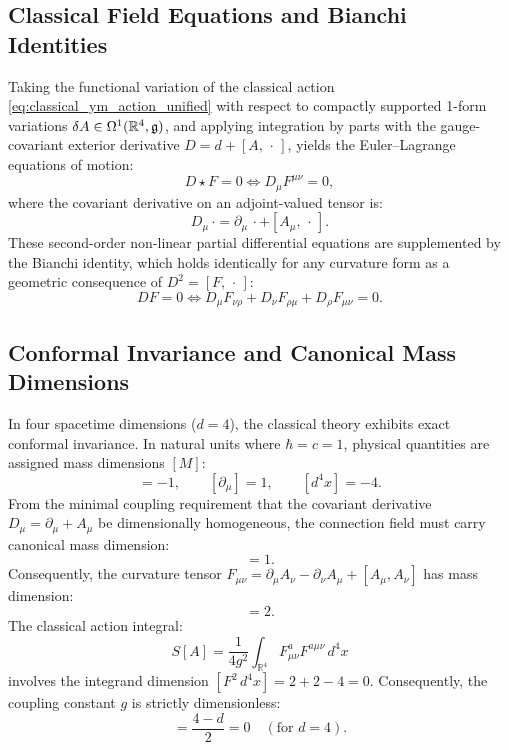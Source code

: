 \subsection{Classical Field Equations and Bianchi Identities}
\label{subsec:classical_eom}
Taking the functional variation of the classical action \eqref{eq:classical_ym_action_unified} with respect to compactly supported 1-form variations $\delta A \in \Omega^1(\mathbb{R}^4, \mathfrak{g})$, and applying integration by parts with the gauge-covariant exterior derivative $D = d + [A, \, \cdot \,]$, yields the Euler--Lagrange equations of motion:
\begin{equation}
\label{eq:classical_eom}
D \star F = 0 \iff D_\mu F^{\mu\nu} = 0,
\end{equation}
where the covariant derivative on an adjoint-valued tensor is:
\begin{equation}
D_\mu \, \cdot = \partial_\mu \, \cdot + [A_\mu, \, \cdot \,].
\end{equation}
These second-order non-linear partial differential equations are supplemented by the Bianchi identity, which holds identically for any curvature form as a geometric consequence of $D^2 = [F, \, \cdot \,]$:
\begin{equation}
\label{eq:bianchi_identity}
D F = 0 \iff D_\mu F_{\nu\rho} + D_\nu F_{\rho\mu} + D_\rho F_{\mu\nu} = 0.
\end{equation}

\subsection{Conformal Invariance and Canonical Mass Dimensions}
\label{subsec:conformal_invariance}
In four spacetime dimensions ($d = 4$), the classical theory exhibits exact conformal invariance. In natural units where $\hbar = c = 1$, physical quantities are assigned mass dimensions $[M]$:
\begin{equation}
[x^\mu] = -1, \qquad [\partial_\mu] = 1, \qquad [d^4x] = -4.
\end{equation}
From the minimal coupling requirement that the covariant derivative $D_\mu = \partial_\mu + A_\mu$ be dimensionally homogeneous, the connection field must carry canonical mass dimension:
\begin{equation}
[A_\mu] = 1.
\end{equation}
Consequently, the curvature tensor $F_{\mu\nu} = \partial_\mu A_\nu - \partial_\nu A_\mu + [A_\mu, A_\nu]$ has mass dimension:
\begin{equation}
[F_{\mu\nu}] = 2.
\end{equation}
The classical action integral:
\begin{equation}
S[A] = \frac{1}{4g^2} \int_{\mathbb{R}^4} F_{\mu\nu}^a F^{a\mu\nu} \, d^4x
\end{equation}
involves the integrand dimension $[F^2 \, d^4x] = 2 + 2 - 4 = 0$. Consequently, the coupling constant $g$ is strictly dimensionless:
\begin{equation}
[g] = \frac{4 - d}{2} = 0 \quad (\text{for } d = 4).
\end{equation}

